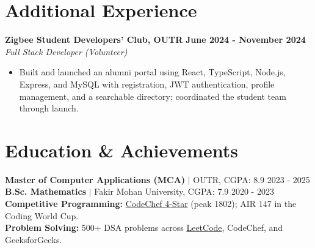 \documentclass[a4paper,11pt]{article}
\begin{document}
\section{Additional Experience}
\textbf{Zigbee Student Developers' Club, OUTR} \hfill \textbf{June 2024 - November 2024}\\
\textit{Full Stack Developer (Volunteer)}
\begin{itemize}
  \item Built and launched an alumni portal using React, TypeScript, Node.js, Express, and MySQL with registration, JWT authentication, profile management, and a searchable directory; coordinated the student team through launch.
\end{itemize}

\section{Education \& Achievements}
\textbf{Master of Computer Applications (MCA)} $|$ OUTR, CGPA: 8.9 \hfill 2023 - 2025\\
\textbf{B.Sc. Mathematics} $|$ Fakir Mohan University, CGPA: 7.9 \hfill 2020 - 2023\\[2pt]
\textbf{Competitive Programming:} \href{https://www.codechef.com/users/banty_dev_29}{CodeChef 4-Star} (peak 1802); AIR 147 in the Coding World Cup.\\
\textbf{Problem Solving:} 500+ DSA problems across \href{https://leetcode.com/u/himanshukumar2910/}{LeetCode}, CodeChef, and GeeksforGeeks.
\end{document}

